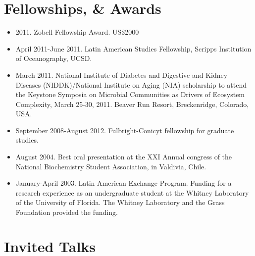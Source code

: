 \documentclass[10pt,letterpaper]{article}
\begin{document}
%


%



\section*{Fellowships, \& Awards}

\begin{itemize}


\item 2011. Zobell Fellowship Award. US\$2000
\item April 2011-June 2011. Latin American Studies Fellowship, Scripps Institution of Oceanography, UCSD.
\item March 2011. National Institute of Diabetes and Digestive and Kidney
Diseases (NIDDK)/National Institute on Aging (NIA) scholarship to attend the Keystone Symposia on Microbial Communities as Drivers of Ecosystem Complexity, March 25-30, 2011. Beaver Run Resort, Breckenridge, Colorado, USA.

\item September 2008-August 2012. Fulbright-Conicyt fellowship for graduate studies.
\item August 2004. Best oral presentation at the XXI Annual congress of the National Biochemistry Student Association, in Valdivia, Chile.
\item January-April 2003. Latin American Exchange Program. Funding for a research experience as an undergraduate student at the Whitney Laboratory of the University of Florida. The Whitney Laboratory and the Grass Foundation provided the funding.

\end{itemize}

\section*{Invited Talks}
\end{document}
